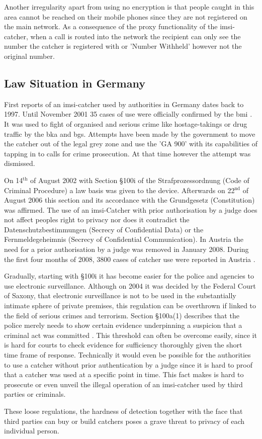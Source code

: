 Another irregularity apart from using no encryption is that people caught in this area cannot be reached on their mobile phones since they are not registered on the main network.
As a consequence of the proxy functionality of the \gls{imsi}-catcher, when a call is routed into the network the recipient can only see the number the catcher is registered with or 'Number Withheld' however not the original number.

\subsection{Law Situation in Germany}
\label{sec:catcher_law}

First reports of an \gls{imsi}-catcher used by authorities in Germany dates back to 1997.
Until November 2001 35 cases of use were officially confirmed by the \gls{bmi} \cite{fox}.
It was used to fight of organised and serious crime like hostage-takings or drug traffic by the \gls{bka} and \gls{bgs}.
Attempts have been made by the government to move the catcher out of the legal grey zone and use the 'GA 900' with its capabilities of tapping in to calls for crime prosecution.
At that time however the attempt was dismissed.

On 14$^\text{th}$ of August 2002 with Section §100i of the Strafprozessordnung (Code of Criminal Procedure) a law basis was given to the device.
Afterwards on 22$^\text{nd}$ of August 2006 this section and its accordance with the Grundgesetz (Constitution) was affirmed.
The use of an \gls{imsi}-Catcher with prior authorisation by a judge does not affect peoples right to privacy nor does it contradict the Datenschutzbestimmungen (Secrecy of Confidential Data) or the Fernmeldegeheimnis (Secrecy of Confidential Communication).
In Austria the need for a prior authorisation by a judge was removed in January 2008.
During the first four months of 2008, 3800 cases of catcher use were reported in Austria \cite{imsi_wiki}.

Gradually, starting with §100i it has become easier for the police and agencies to use electronic surveillance.
Although on 2004 it was decided by the Federal Court of Saxony, that electronic surveillance is not to be used in the substantially intimate sphere of private premises, this regulation can be overthrown if linked to the field of serious crimes and terrorism.
Section §100a(1) describes that the police merely needs to show certain evidence underpinning a suspicion that a criminal act was committed \cite{criminal_justice}.
This threshold can often be overcome easily, since it is hard for courts to check evidence for sufficiency thoroughly given the short time frame of response.
Technically it would even be possible for the authorities to use a catcher without prior authentication by a judge since it is hard to proof that a catcher was used at a specific point in time.
This fact makes is hard to prosecute or even unveil the illegal operation of an \gls{imsi}-catcher used by third parties or criminals.

These loose regulations, the hardness of detection together with the face that third parties  can buy or build catchers poses a grave threat to privacy of each individual person.